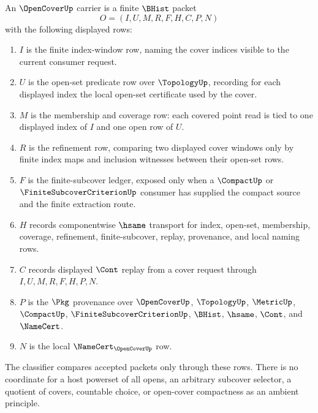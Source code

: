 \begin{definition}
\label{def:open-cover-carrier}
An $\OpenCoverUp$ carrier is a finite $\BHist$ packet
$$
O=(I,U,M,R,F,H,C,P,N)
$$
with the following displayed rows:
\begin{enumerate}
  \item $I$ is the finite index-window row, naming the cover indices visible to the current consumer request.
  \item $U$ is the open-set predicate row over $\TopologyUp$, recording for each displayed index the local open-set certificate used by the cover.
  \item $M$ is the membership and coverage row: each covered point read is tied to one displayed index of $I$ and one open row of $U$.
  \item $R$ is the refinement row, comparing two displayed cover windows only by finite index maps and inclusion witnesses between their open-set rows.
  \item $F$ is the finite-subcover ledger, exposed only when a $\CompactUp$ or $\FiniteSubcoverCriterionUp$ consumer has supplied the compact source and the finite extraction route.
  \item $H$ records componentwise $\hsame$ transport for index, open-set, membership, coverage, refinement, finite-subcover, replay, provenance, and local naming rows.
  \item $C$ records displayed $\Cont$ replay from a cover request through $I,U,M,R,F,H,P,N$.
  \item $P$ is the $\Pkg$ provenance over $\OpenCoverUp$, $\TopologyUp$, $\MetricUp$, $\CompactUp$, $\FiniteSubcoverCriterionUp$, $\BHist$, $\hsame$, $\Cont$, and $\NameCert$.
  \item $N$ is the local $\NameCert_{\OpenCoverUp}$ row.
\end{enumerate}
The classifier compares accepted packets only through these rows. There is no coordinate for a host powerset of all opens, an arbitrary subcover selector, a quotient of covers, countable choice, or open-cover compactness as an ambient principle.
\end{definition}

